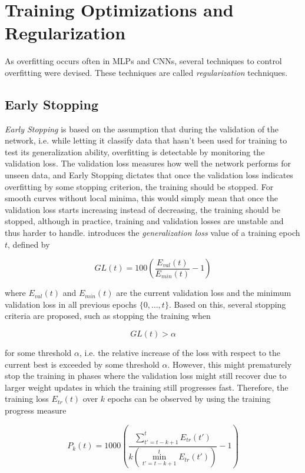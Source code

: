 	\section {Training Optimizations and Regularization}
	As overfitting occurs often in MLPs and CNNs, several techniques to control overfitting were devised. These techniques are called \textit{regularization} techniques.

	\subsection{Early Stopping}
\textit{Early Stopping} is based on the assumption that during the validation of the network, i.e. while letting it classify data that hasn't been used for training to test its generalization ability, overfitting is detectable by monitoring the validation loss. The validation loss measures how well the network performs for unseen data, and Early Stopping dictates that once the validation loss indicates overfitting by some stopping criterion, the training should be stopped. For smooth curves without local minima, this would simply mean that once the validation loss starts increasing instead of decreasing, the training should be stopped, although in practice, training and validation losses are unstable and thus harder to handle. \cite{early_stopping} introduces the \textit{generalization loss} value of a training epoch $t$, defined by

\[ GL(t) = 100 \left ( \frac{E_{val}(t)}{E_{min}(t)} - 1 \right ) \]

\noindent where $E_{val}(t)$ and $E_{min}(t)$ are the current validation loss and the minimum validation loss in all previous epochs $\{0, \dots, t\}$. Based on this, several stopping criteria are proposed, such as stopping the training when 

\[ GL(t) > \alpha \]

\noindent for some threshold $\alpha$, i.e. the relative increase of the loss with respect to the current best is exceeded by some threshold $\alpha$. However, this might prematurely stop the training in phases where the validation loss might still recover due to larger weight updates in which the training still progresses fast. Therefore, the training loss $E_{tr}(t)$ over $k$ epochs can be observed by using the training progress measure

\[ P_k(t) = 1000 \left ( \frac{\sum_{t' = t - k + 1}^{t} E_{tr}(t')}{k (\min_{t' = t - k + 1}^{t} E_{tr}(t'))} - 1 \right ) \]

